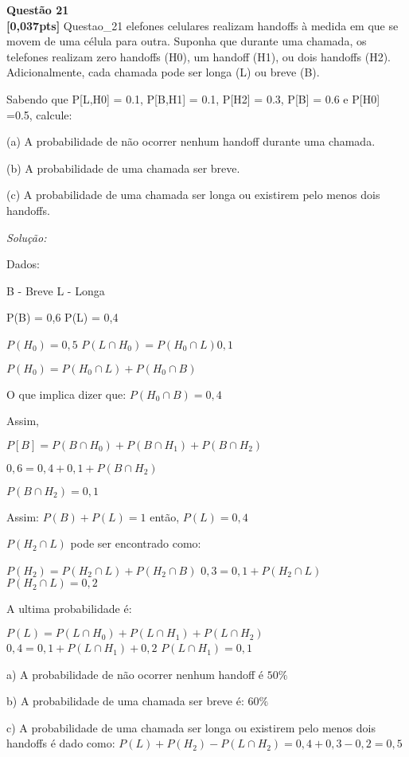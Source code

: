 \documentclass{article}
\newenvironment{problem}[2][Questão]
    { \begin{mdframed}[backgroundcolor=gray!20] \textbf{#1 #2} \\}
    {  \end{mdframed}}
\newenvironment{solution}
    {\textit{Solução:}}
    {}
\begin{document}
\begin{problem}{21}
\textbf{[0,037pts]} Questao\_21 elefones celulares realizam handoffs à medida em que se movem de uma célula para outra. 
Suponha que durante uma chamada, os telefones realizam zero handoffs (H0), um handoff (H1), ou dois handoffs (H2). Adicionalmente, cada chamada pode ser longa (L) ou breve (B). 

Sabendo que P[L,H0] = 0.1, P[B,H1] = 0.1, P[H2] = 0.3, P[B] = 0.6 e P[H0] =0.5, calcule: 

(a) A probabilidade de não ocorrer nenhum handoff durante uma chamada. 

(b) A probabilidade de uma chamada ser breve.

(c) A probabilidade de uma chamada ser longa ou existirem pelo menos dois handoffs.

\end{problem}

\begin{solution}

Dados:

B - Breve \newline
L - Longa

P(B) = 0,6
P(L) = 0,4

$P(H_{0}) = 0,5$
$P(L \cap H_{0}) = P(H_{0} \cap L) 0,1$

$P(H_{0}) = P(H_{0} \cap L) + P(H_{0} \cap B)$

O que implica dizer que: $P(H_{0} \cap B) = 0,4$

Assim,

$P[B] = P(B \cap H_{0}) + P(B \cap H_{1}) + P(B \cap H_{2})$

$0,6 = 0,4 + 0,1 + P(B \cap H_{2})$

$P(B \cap H_{2}) = 0,1$

Assim: $P(B) + P(L) = 1$ então, $P(L) = 0,4$

$P(H_{2} \cap L)$ pode ser encontrado como:

$P(H_{2}) = P(H_{2} \cap L) + P(H_{2} \cap B)$
$0,3 = 0,1 + P(H_{2} \cap L)$
$P(H_{2} \cap L) = 0,2$

A ultima probabilidade é:

$P(L) = P(L \cap H_{0}) + P(L \cap H_{1}) + P(L \cap H_{2})$
$0,4 = 0,1 + P(L \cap H_{1}) + 0,2$
$P(L \cap H_{1}) = 0,1$

a) A probabilidade de não ocorrer nenhum handoff é $50\%$

b) A probabilidade de uma chamada ser breve é: $60\%$

c) A probabilidade de uma chamada ser longa ou existirem pelo menos dois handoffs é dado como: $P(L) + P(H_{2}) - P(L \cap H_{2}) = 0,4+0,3 - 0,2 = 0,5$
\end{solution}
\end{document}
